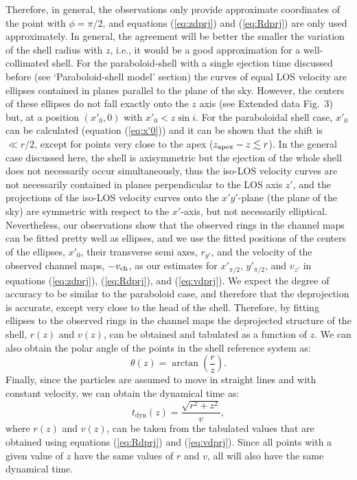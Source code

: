 \documentclass[12pt]{mythesis}
\begin{document}
 Therefore, in general, the observations only provide approximate coordinates of the point with $\phi=\pi/2$, and equations (\ref{eq:zdprj}) and (\ref{eq:Rdprj}) are only used approximately. In general, the agreement will be better the smaller the variation of the shell radius with $z$, i.e., it would be a good approximation for a well-collimated shell. For the paraboloid-shell with a single ejection time discussed before (see `Paraboloid-shell model' section) the curves of equal LOS velocity are ellipses contained in planes parallel to the plane of the sky. However, the centers of these ellipses do not fall exactly onto the $z$ axis (see Extended data Fig.~3) but, at a position $(x'_0, 0)$ with $x'_0 < z \sin i$. For the paraboloidal shell case, $x'_0$ can be calculated (equation (\ref{eq:x'0})) and it can be shown that the shift is $\ll r/2$, except for points very close to the apex ($z_{\rm apex}-z\lesssim r$). In the general case discussed here, the shell is axisymmetric but the ejection of the whole shell does not necessarily occur simultaneously, thus the iso-LOS velocity curves are not necessarily contained in planes perpendicular to the LOS axis $z'$, and the projections of the iso-LOS velocity curves onto the $x'y'$-plane (the plane of the sky) are symmetric with respect to the $x'$-axis, but not necessarily elliptical. Nevertheless, our observations show that the observed rings in the channel maps can be fitted pretty well as ellipses, and we use the fitted positions of the centers of the ellipses, $x'_0$, their transverse semi axes, $r_{y'}$, and the velocity of the observed channel maps, $-v_{\rm ch}$, as our estimates for $x'_{\pi/2}$, $y'_{\pi/2}$, and $v_{z'}$ in equations (\ref{eq:zdprj}), (\ref{eq:Rdprj}), and (\ref{eq:vdprj}). We expect the degree of accuracy to be similar to the paraboloid case, and therefore that the deprojection is accurate, except very close to the head of the shell. Therefore, by fitting ellipses to the observed rings in the channel maps the deprojected structure of the shell, $r(z)$ and $v(z)$, can be obtained and tabulated as a function of $z$. We can also obtain the polar angle of the points in the shell reference system as:
\begin{equation}\label{theta(z)}
\theta(z) = \arctan\left(\frac{r}{z}\right).
\end{equation}
Finally, since the particles are assumed to move in straight lines and with constant velocity, we can obtain the dynamical time as: 
\begin{equation}\label{eq:tkin}
	t_\mathrm{dyn}(z)=\frac{\sqrt{r^2+z^2}}{v},
\end{equation}
where $r(z)$ and $v(z)$, can be taken from the tabulated values that are obtained using equations (\ref{eq:Rdprj}) and (\ref{eq:vdprj}). Since all points with a given value of $z$ have the same values of $r$ and $v$, all will also have the same dynamical time.
\end{document}
